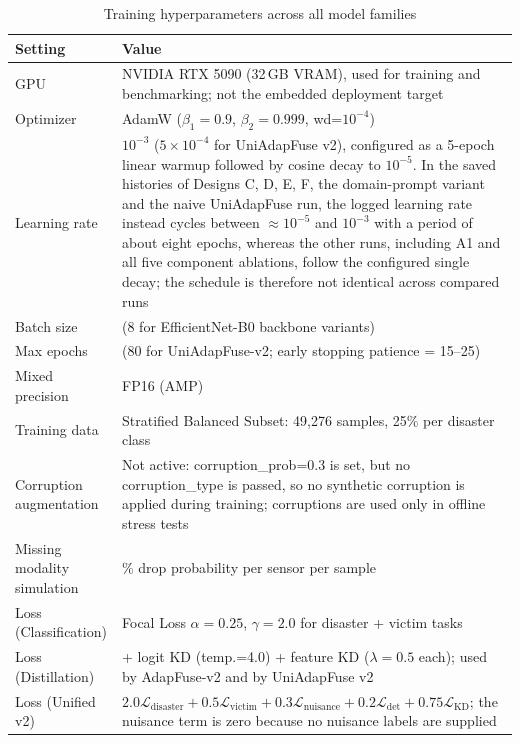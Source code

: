 \documentclass[journal]{IEEEtran}
\begin{document}
\begin{table}[!t]
\centering
\caption[Training hyperparameters]{Training hyperparameters across all model families}
\label{tab:training}
\begin{tabular}{@{}l>{\raggedright\arraybackslash}p{9.2cm}@{}}
\toprule
\textbf{Setting} & \textbf{Value} \\
\midrule
GPU & NVIDIA RTX 5090 (32\,GB VRAM), used for training and benchmarking; not the embedded deployment target \\
Optimizer & AdamW ($\beta_1=0.9$, $\beta_2=0.999$, wd=$10^{-4}$) \\
Learning rate & $10^{-3}$ ($5\times10^{-4}$ for UniAdapFuse v2), configured as a 5-epoch linear warmup followed by cosine decay to $10^{-5}$. In the saved histories of Designs C, D, E, F, the domain-prompt variant and the naive UniAdapFuse run, the logged learning rate instead cycles between $\approx10^{-5}$ and $10^{-3}$ with a period of about eight epochs, whereas the other runs, including A1 and all five component ablations, follow the configured single decay; the schedule is therefore not identical across compared runs \\
Batch size & 16 (8 for EfficientNet-B0 backbone variants) \\
Max epochs & 50 (80 for UniAdapFuse-v2; early stopping patience = 15--25) \\
Mixed precision & FP16 (AMP) \\
Training data & Stratified Balanced Subset: 49{,}276 samples, 25\% per disaster class \\
Corruption augmentation & Not active: corruption\_prob=0.3 is set, but no corruption\_type is passed, so no synthetic corruption is applied during training; corruptions are used only in offline stress tests \\
Missing modality simulation & 20\% drop probability per sensor per sample \\
Loss (Classification) & Focal Loss $\alpha=0.25$, $\gamma=2.0$ for disaster + victim tasks \\
Loss (Distillation) & + logit KD (temp.=4.0) + feature KD ($\lambda=0.5$ each); used by AdapFuse-v2 and by UniAdapFuse v2 \\
Loss (Unified v2) & $2.0 \mathcal{L}_{\text{disaster}} + 0.5 \mathcal{L}_{\text{victim}} + 0.3 \mathcal{L}_{\text{nuisance}} + 0.2 \mathcal{L}_{\text{det}} + 0.75 \mathcal{L}_{\text{KD}}$; the nuisance term is zero because no nuisance labels are supplied \\
\bottomrule
\end{tabular}
\end{table}
\end{document}
